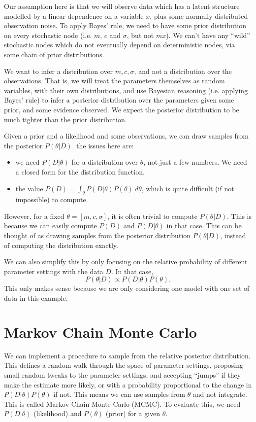 \documentclass[a4paper, openany]{memoir}
\begin{document}
Our assumption here is that we will observe data which has a latent structure modelled by a linear dependence on a variable $x$, plus some normally-distributed observation noise. To apply Bayes' rule, we need to have some prior distribution on every stochastic node (i.e. $m$, $c$ and $\sigma$, but not $mx$). We can't have any ``wild'' stochastic nodes which do not eventually depend on deterministic nodes, via some chain of prior distributions.

We want to infer a distribution over $m, c, \sigma$, and not a distribution over the observations. That is, we will treat the parameters themselves as random variables, with their own distributions, and use Bayesian reasoning (i.e. applying Bayes' rule) to infer a posterior distribution over the parameters given some prior, and some evidence observed. We expect the posterior distribution to be much tighter than the prior distribution.

Given a prior and a likelihood and some observations, we can draw samples from the posterior $P(\theta|D)$. the issues here are:
\begin{itemize}
    \item we need $P(D|\theta)$ for a distribution over $\theta$, not just a few numbers. We need a closed form for the distribution function.
    \item the value $P(D) = \int_\theta P(D|\theta) P(\theta) \ d\theta$, which is quite difficult (if not impossible) to compute.
\end{itemize}
However, for a fixed $\theta = [m, c, \sigma]$, it is often trivial to compute $P(\theta|D)$. This is because we can easily compute $P(D)$ and $P(D|\theta)$ in that case. This can be thought of as drawing samples from the posterior distribution $P(\theta|D)$, instead of computing the distribution exactly.

We can also simplify this by only focusing on the relative probability of different parameter settings with the data $D$. In that case,
\[P(\theta|D) \propto P(D|\theta) P(\theta).\]
This only makes sense because we are only considering one model with one set of data in this example.

\section{Markov Chain Monte Carlo}
We can implement a procedure to sample from the relative posterior distribution. This defines a random walk through the space of parameter settings, proposing small random tweaks to the parameter settings, and accepting ``jumps'' if they make the estimate more likely, or with a probability proportional to the change in $P(D|\theta) P(\theta)$ if not. This means we can use samples from $\theta$ and not integrate. This is called Markov Chain Monte Carlo (MCMC). To evaluate this, we need $P(D|\theta)$ (likelihood) and $P(\theta)$ (prior) for a given $\theta$.
\end{document}
